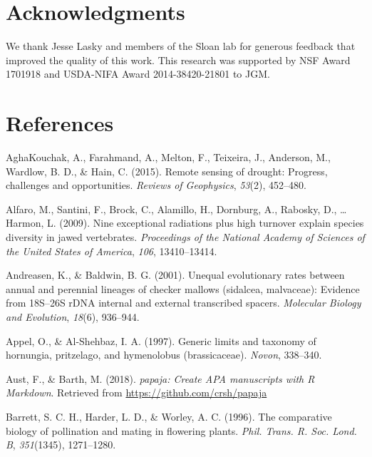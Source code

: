 \documentclass[man,floatsintext]{apa6}
\theoremstyle{definition}
\theoremstyle{definition}
\theoremstyle{definition}
\theoremstyle{remark}
\begin{document}
\hypertarget{acknowledgments}{%
\section{Acknowledgments}\label{acknowledgments}}

We thank Jesse Lasky and members of the Sloan lab for generous feedback
that improved the quality of this work. This research was supported by
NSF Award 1701918 and USDA-NIFA Award 2014-38420-21801 to JGM.

\hypertarget{references}{%
\section{References}\label{references}}

\newpage

\begingroup
\setlength{\parindent}{-0.5in}
\setlength{\leftskip}{0.5in}

\hypertarget{refs}{}
\leavevmode\hypertarget{ref-aghakouchak2015remote}{}%
AghaKouchak, A., Farahmand, A., Melton, F., Teixeira, J., Anderson, M.,
Wardlow, B. D., \& Hain, C. (2015). Remote sensing of drought: Progress,
challenges and opportunities. \emph{Reviews of Geophysics},
\emph{53}(2), 452--480.

\leavevmode\hypertarget{ref-R-geiger_a}{}%
Alfaro, M., Santini, F., Brock, C., Alamillo, H., Dornburg, A., Rabosky,
D., \ldots{} Harmon, L. (2009). Nine exceptional radiations plus high
turnover explain species diversity in jawed vertebrates.
\emph{Proceedings of the National Academy of Sciences of the United
States of America}, \emph{106}, 13410--13414.

\leavevmode\hypertarget{ref-andreasen2001unequal}{}%
Andreasen, K., \& Baldwin, B. G. (2001). Unequal evolutionary rates
between annual and perennial lineages of checker mallows (sidalcea,
malvaceae): Evidence from 18S--26S rDNA internal and external
transcribed spacers. \emph{Molecular Biology and Evolution},
\emph{18}(6), 936--944.

\leavevmode\hypertarget{ref-appel1997generic}{}%
Appel, O., \& Al-Shehbaz, I. A. (1997). Generic limits and taxonomy of
hornungia, pritzelago, and hymenolobus (brassicaceae). \emph{Novon},
338--340.

\leavevmode\hypertarget{ref-R-papaja}{}%
Aust, F., \& Barth, M. (2018). \emph{papaja: Create APA manuscripts with
R Markdown}. Retrieved from \url{https://github.com/crsh/papaja}

\leavevmode\hypertarget{ref-barrett1996comparative}{}%
Barrett, S. C. H., Harder, L. D., \& Worley, A. C. (1996). The
comparative biology of pollination and mating in flowering plants.
\emph{Phil. Trans. R. Soc. Lond. B}, \emph{351}(1345), 1271--1280.
\end{document}
